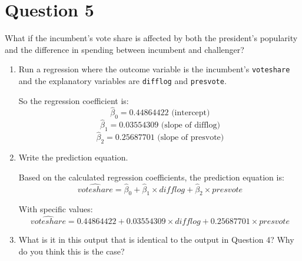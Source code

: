 \documentclass[12pt,letterpaper]{article}
\begin{document}
\section*{Question 5}
\noindent What if the incumbent's vote share is affected by both the president's popularity and the difference in spending between incumbent and challenger? 
	\begin{enumerate}
		\item Run a regression where the outcome variable is the incumbent's \texttt{voteshare} and the explanatory variables are \texttt{difflog} and \texttt{presvote}.	
		
		\vspace{.5cm}
		 
		So the regression coefficient is:\\
		$$
		\hat{\beta}_0 = 0.44864422 \text{ (intercept)}
		$$
		$$
		\hat{\beta}_1 = 0.03554309 \text{ (slope of difflog)}
		$$
		$$
		\hat{\beta}_2 = 0.25687701 \text{ (slope of presvote)}
		$$
		\vspace{.5cm}
		
		\item Write the prediction equation.	
		
		\vspace{.5cm}
		Based on the calculated regression coefficients, the prediction equation is:
		$$
		\hat{voteshare} = \hat{\beta}_0 + \hat{\beta}_1 \times difflog + \hat{\beta}_2 \times presvote
		$$
		
		With specific values:
		$$
		\hat{voteshare} = 0.44864422 + 0.03554309 \times difflog + 0.25687701 \times presvote
		$$
		
		\item What is it in this output that is identical to the output in Question 4? Why do you think this is the case?
		

\end{enumerate}
\end{document}
